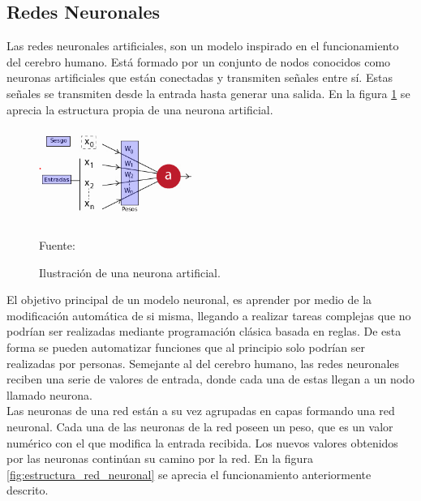 
\subsection{Redes Neuronales}
Las redes neuronales artificiales, son un modelo inspirado en el funcionamiento del cerebro humano. Está formado por un conjunto de nodos conocidos como neuronas artificiales que están conectadas y transmiten señales entre sí. Estas señales se transmiten desde la entrada hasta generar una salida. En la figura \ref{fig:classical_ml} se aprecia la estructura propia de una neurona artificial.\\

\begin{figure}[H]
    \begin{center}
        \includegraphics[width=5.5cm]{img/capitulo_2/neurona.png}
        \caption{Ilustración de una neurona artificial.}
        Fuente: \cite{tensorflow_neurona}
    \label{fig:classical_ml}
    \end{center}
\end{figure}

El objetivo principal de un modelo neuronal, es aprender por medio de la modificación automática de si misma, llegando a realizar tareas complejas que no podrían ser realizadas mediante programación clásica basada en reglas. De esta forma se pueden automatizar funciones que al principio solo podrían ser realizadas por personas. Semejante al del cerebro humano, las redes neuronales reciben una serie de valores de entrada, donde cada una de estas llegan a un nodo llamado neurona.\\

Las neuronas de una red están a su vez agrupadas en capas formando una red neuronal. Cada una de las neuronas de la red poseen un peso, que es un valor numérico con el que modifica la entrada recibida. Los nuevos valores obtenidos por las neuronas continúan su camino por la red. En la figura \ref{fig:estructura_red_neuronal} se aprecia el funcionamiento anteriormente descrito.\\

